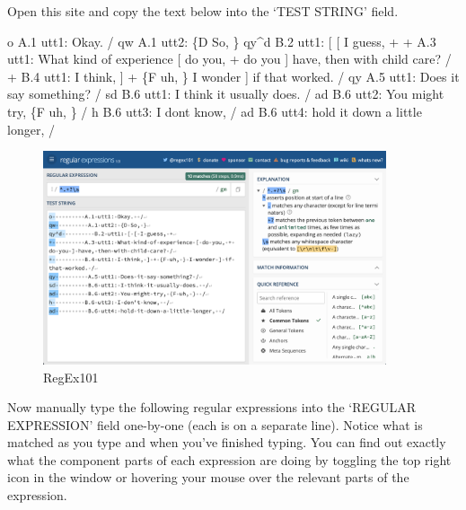 \documentclass[
  letterpaper,
]{latex/krantz}
\newenvironment{Shaded}{\begin{snugshade}}{\end{snugshade}}
\newcommand{\NormalTok}[1]{\textcolor[rgb]{0.00,0.23,0.31}{#1}}
\begin{document}
Open this site and copy the text below into the `TEST STRING' field.

\begin{Shaded}
\begin{Highlighting}[]
\NormalTok{o          A.1 utt1: Okay.  /}
\NormalTok{qw          A.1 utt2: \{D So, \}}
\NormalTok{qy\^{}d          B.2 utt1: [ [ I guess, +}
\NormalTok{+          A.3 utt1: What kind of experience [ do you, + do you ] have, then with child care? /}
\NormalTok{+          B.4 utt1: I think, ] + \{F uh, \} I wonder ] if that worked. /}
\NormalTok{qy          A.5 utt1: Does it say something? /}
\NormalTok{sd          B.6 utt1: I think it usually does.  /}
\NormalTok{ad          B.6 utt2: You might try, \{F uh, \}  /}
\NormalTok{h          B.6 utt3: I don\textquotesingle{}t know,  /}
\NormalTok{ad          B.6 utt4: hold it down a little longer,  /}
\end{Highlighting}
\end{Shaded}

\begin{figure}[h]

{\centering \includegraphics[width=0.9\textwidth,height=\textheight]{./figures/curate-datasets/cd-regex-101.png}

}

\caption{\label{fig-cd-regex-101-image}RegEx101}

\end{figure}

Now manually type the following regular expressions into the `REGULAR
EXPRESSION' field one-by-one (each is on a separate line). Notice what
is matched as you type and when you've finished typing. You can find out
exactly what the component parts of each expression are doing by
toggling the top right icon in the window or hovering your mouse over
the relevant parts of the expression.
\end{document}
